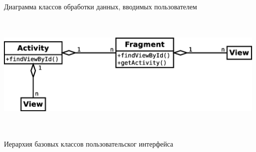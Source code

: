 \documentclass[russian,utf8,a1paper,nostitching,simple]{eskdgraph}
\begin{document}
\begin{ESKDdrawing}
\begin{minipage}{.67\linewidth}
    \vspace{2cm}
    {\Huge{Диаграмма классов обработки данных, вводимых пользователем}}
  \end{minipage}
  \hspace{4cm}
  \begin{minipage}{0.25\linewidth}
    \centering
    \includegraphics[height=6cm]{fig/implementation_ui_hierarchy.eps}

    \vspace{2cm}
    {\Huge{Иерархия базовых классов пользовательског интерфейса}}


\end{minipage}
\end{ESKDdrawing}
\end{document}
